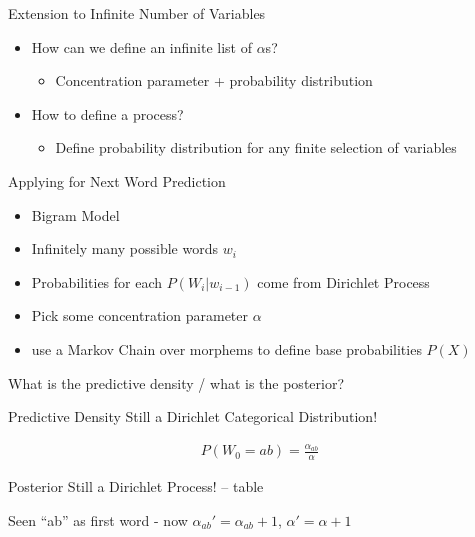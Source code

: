 \documentclass[11pt]{beamer}
\begin{document}
	\begin{frame}{Extension to Infinite Number of Variables}
		\begin{itemize}
			\item How can we define an infinite list of $\alpha$s?
			\begin{itemize}
				\item Concentration parameter + probability distribution \checkmark
			\end{itemize}
			\item How to define a process?
			\begin{itemize}
				\item Define probability distribution for any finite selection of variables \checkmark
			\end{itemize}
		\end{itemize}
	\end{frame}
	
	\begin{frame}{Applying for Next Word Prediction}
		\begin{itemize}
			\item Bigram Model
			\item Infinitely many possible words $w_i$
			\item Probabilities for each $P(W_i|w_{i-1})$ come from Dirichlet Process
			\item Pick some concentration parameter $\alpha$
			\item use a Markov Chain over morphems to define base probabilities $P(X)$
		\end{itemize}
		
		\vspace{10pt} What is the predictive density / what is the posterior?
	\end{frame}
	
	\begin{frame}{Predictive Density}
		Still a Dirichlet Categorical Distribution!
		
		\begin{align*}
			P(W_{0}=ab) = \frac{\alpha_{ab}}{\alpha}
		\end{align*}
	\end{frame}
	
	\begin{frame}{Posterior}
		Still a Dirichlet Process! -- table
		
		\vspace{10pt} Seen ``ab'' as first word - now $\alpha_{ab}' = \alpha_{ab}+1$, $\alpha' = \alpha + 1$ 
	\end{frame}
	
\end{document}

